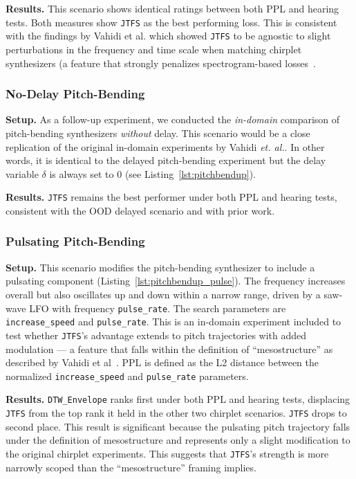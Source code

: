 \documentclass[10pt]{article} %
\newcommand{\JTFS}{\texttt{JTFS}\xspace}
\newcommand{\DTWEnv}{\texttt{DTW\_\allowbreak Envelope}\xspace}
\begin{document}
\noindent \textbf{Results.} This scenario shows identical ratings between both PPL and hearing tests. Both measures show \JTFS as the best performing loss. This is consistent with the findings by Vahidi et al. which showed \JTFS to be agnostic to slight perturbations in the frequency and time scale when matching chirplet synthesizers (a feature that strongly penalizes spectrogram-based losses~\cite{vahidi2023mesostructures}. 


\subsubsection{No-Delay Pitch-Bending}
\label{sec:no_delayed_chirplet}
\textbf{Setup.} As a follow-up experiment, we conducted the \textit{in-domain} comparison of pitch-bending synthesizers \textit{without} delay. This scenario would be a close replication of the original in-domain experiments by Vahidi \textit{et. al.}. In other words, it is identical to the delayed pitch-bending experiment but the delay variable $\delta$ is always set to 0 (see Listing~\ref{lst:pitchbendup}).  

\noindent \textbf{Results.} \JTFS remains the best performer under both PPL and hearing tests, consistent with the OOD delayed scenario and with prior work. 

\subsubsection{Pulsating Pitch-Bending}
\label{sec:pulsating_chirplet}
\textbf{Setup.} This scenario modifies the pitch-bending synthesizer to include a pulsating component (Listing~\ref{lst:pitchbendup_pulse}). The frequency increases overall but also oscillates up and down within a narrow range, driven by a saw-wave LFO with frequency \texttt{pulse\_rate}. The search parameters are \texttt{increase\_speed} and \texttt{pulse\_rate}. This is an in-domain experiment included to test whether \JTFS's advantage extends to pitch trajectories with added modulation --- a feature that falls within the definition of ``mesostructure'' as described by Vahidi et al~\cite{vahidi2023mesostructures}. PPL is defined as the L2 distance between the normalized \texttt{increase\_speed} and \texttt{pulse\_rate} parameters.

\noindent \textbf{Results.} \DTWEnv ranks first under both PPL and hearing tests, displacing \JTFS from the top rank it held in the other two chirplet scenarios. \JTFS drops to second place. This result is significant because the pulsating pitch trajectory falls under the definition of mesostructure and represents only a slight modification to the original chirplet experiments. This suggests that \JTFS's strength is more narrowly scoped than the ``mesostructure'' framing implies.
\end{document}
